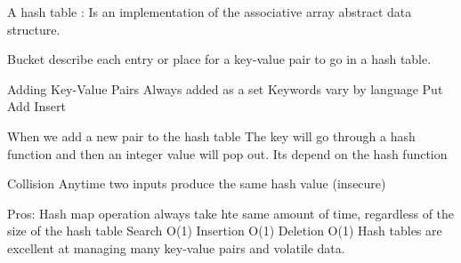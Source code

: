 A hash table : 
  Is an implementation of the associative array abstract data structure.

Bucket 
  describe each entry or place for a key-value pair to go in a hash table.

Adding Key-Value Pairs 
  Always added as a set 
  Keywords vary by language 
    Put 
    Add 
    Insert

When we add a new pair to the hash table
  The key will go through a hash function and then an integer value will pop out. 
  Its depend on the hash function 

Collision
  Anytime two inputs produce the same hash value (insecure)

Pros: 
  Hash map operation always take hte same amount of time, regardless of the size of the hash table 
  Search O(1)
  Insertion O(1)
  Deletion O(1) 
  Hash tables are excellent at managing many key-value pairs and volatile data.

